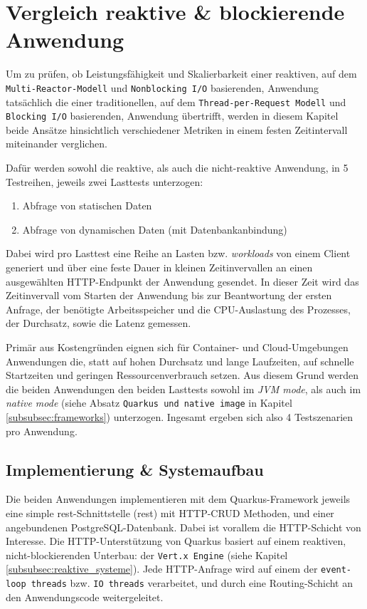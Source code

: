 \section {Vergleich reaktive \& blockierende Anwendung}
\label{section:vergleich_reaktiv_blockierend}
Um zu prüfen, ob Leistungsfähigkeit und Skalierbarkeit einer reaktiven, auf dem \newline
\verb|Multi-Reactor-Modell| und \verb|Nonblocking I/O| basierenden,
Anwendung tatsächlich die einer traditionellen, auf dem \verb|Thread-per-Request Modell| und \verb|Blocking I/O| basierenden, Anwendung übertrifft, werden in
diesem Kapitel beide Ansätze hinsichtlich verschiedener Metriken in einem festen Zeitintervall miteinander verglichen.

Dafür werden sowohl die reaktive, als auch die nicht-reaktive Anwendung, in 5 Testreihen, jeweils zwei Lasttests unterzogen:
\begin{enumerate}
  \item Abfrage von statischen Daten
  \item Abfrage von dynamischen Daten (mit Datenbankanbindung)
\end{enumerate}
Dabei wird pro Lasttest eine Reihe an Lasten bzw. \textit{workloads} von einem Client generiert und über eine feste Dauer in kleinen Zeitinvervallen
an einen ausgewählten HTTP-Endpunkt der Anwendung gesendet.
In dieser Zeit wird das Zeitinvervall vom Starten der Anwendung bis zur Beantwortung der ersten Anfrage,
der benötigte Arbeitsspeicher und die CPU-Auslastung des Prozesses, der Durchsatz, sowie die Latenz gemessen.

Primär aus Kostengründen eignen sich für Container- und Cloud-Umgebungen Anwendungen die, statt auf hohen Durchsatz und lange Laufzeiten,
auf schnelle Startzeiten und geringen Ressourcenverbrauch setzen.
Aus diesem Grund werden die beiden Anwendungen den beiden Lasttests sowohl im \textit{JVM mode}, als auch im \textit{native mode}
(siehe Absatz \verb|Quarkus und native image| in Kapitel \ref{subsubsec:frameworks})
unterzogen. Ingesamt ergeben sich also 4 Testszenarien pro Anwendung.

\subsection{Implementierung \& Systemaufbau}
\label{section:implementierung}
Die beiden Anwendungen implementieren mit dem Quarkus-Framework jeweils eine simple \acrshort{rest}-Schnittstelle (\acrlong{rest})
mit HTTP-CRUD Methoden, und einer angebundenen PostgreSQL-Datenbank.
Dabei ist vorallem die HTTP-Schicht von Interesse. Die HTTP-Unterstützung von Quarkus basiert auf einem reaktiven, nicht-blockierenden
Unterbau: der \verb|Vert.x Engine| (siehe Kapitel \ref{subsubsec:reaktive_systeme}).
Jede HTTP-Anfrage wird auf einem der \verb|event-loop threads| bzw. \verb|IO threads|
verarbeitet, und durch eine Routing-Schicht an den Anwendungscode weitergeleitet.

